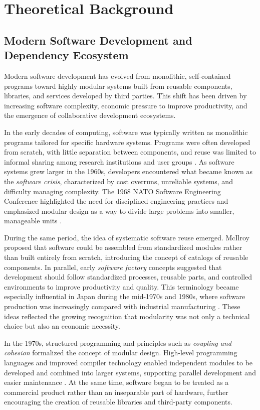 \documentclass[12pt,a4paper]{report}
\begin{document}
\chapter{Theoretical Background}
\section{Modern Software Development and Dependency Ecosystem}

Modern software development has evolved from monolithic, self-contained programs toward highly modular systems built from reusable components, libraries, and services developed by third parties. This shift has been driven by increasing software complexity, economic pressure to improve productivity, and the emergence of collaborative development ecosystems.

In the early decades of computing, software was typically written as monolithic programs tailored for specific hardware systems. Programs were often developed from scratch, with little separation between components, and reuse was limited to informal sharing among research institutions and user groups \parencite{ojhaEmergenceOrganizationalField2014}. As software systems grew larger in the 1960s, developers encountered what became known as the \emph{software crisis}, characterized by cost overruns, unreliable systems, and difficulty managing complexity. The 1968 NATO Software Engineering Conference highlighted the need for disciplined engineering practices and emphasized modular design as a way to divide large problems into smaller, manageable units \parencite{randellSoftwareEngineering19681979}.

During the same period, the idea of systematic software reuse emerged. McIlroy proposed that software could be assembled from standardized modules rather than built entirely from scratch, introducing the concept of catalogs of reusable components. In parallel, early \emph{software factory} concepts suggested that development should follow standardized processes, reusable parts, and controlled environments to improve productivity and quality. This terminology became especially influential in Japan during the mid-1970s and 1980s, where software production was increasingly compared with industrial manufacturing \parencite{cusumanoSoftwareFactoryHistorical1989}. These ideas reflected the growing recognition that modularity was not only a technical choice but also an economic necessity.

In the 1970s, structured programming and principles such as \emph{coupling and cohesion} formalized the concept of modular design. High-level programming languages and improved compiler technology enabled independent modules to be developed and combined into larger systems, supporting parallel development and easier maintenance \parencite{newmanMonolithMicroservicesEvolutionary2019}. At the same time, software began to be treated as a commercial product rather than an inseparable part of hardware, further encouraging the creation of reusable libraries and third-party components.
\end{document}
